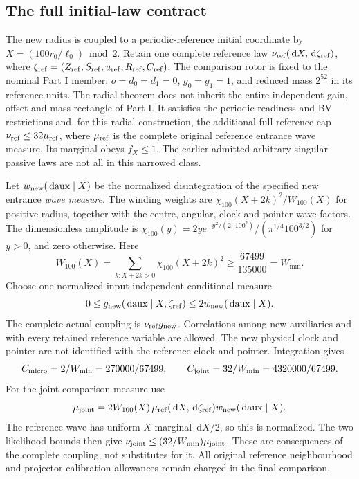 \documentclass[11pt]{article}
\theoremstyle{definition}\newtheorem{definition}[theorem]{Definition}
\theoremstyle{remark}\newtheorem{remark}[theorem]{Remark}
\newcommand{\dd}{\,\mathrm d}\newcommand{\Imv}{\operatorname{Im}}\newcommand{\ii}{\mathrm i}
\begin{document}
\subsection{The full initial-law contract}\label{sec:radial_law}
The new radius is coupled to a periodic-reference initial coordinate
by $X=(100r_0/\ell_0)\bmod2$. Retain one complete reference law
$\nu_{\rm ref}(\dd X,\dd\zeta_{\rm ref})$, where
$\zeta_{\rm ref}=(Z_{\rm ref},S_{\rm ref},u_{\rm ref},R_{\rm ref},C_{\rm ref})$.
The comparison rotor is fixed to the nominal Part I member:
$o=d_0=d_1=0$, $g_0=g_1=1$, and reduced mass $2^{52}$ in its
reference units. The radial theorem does not inherit the entire
independent gain, offset and mass rectangle of Part I.
It satisfies the periodic readiness and BV restrictions and, for this
radial construction, the additional full reference cap $\nu_{\rm ref}\le32\mu_{\rm ref}$,
where $\mu_{\rm ref}$ is the complete original reference entrance
wave measure. Its
marginal obeys $f_X\le1$. The earlier admitted arbitrary singular
passive laws are not all in this narrowed class.

Let $w_{\rm new}(\dd\mathrm{aux}\mid X)$ be the normalized
disintegration of the specified new entrance \emph{wave measure}.
The winding weights are $\chi_{100}(X+2k)^2/W_{100}(X)$ for positive
radius, together with the centre, angular, clock and pointer wave
factors. The dimensionless amplitude is
$\chi_{100}(y)=2y e^{-y^2/(2\cdot100^2)}/(\pi^{1/4}100^{3/2})$
for $y>0$, and zero otherwise. Here
\[
 W_{100}(X)=\sum_{k:X+2k>0}\chi_{100}(X+2k)^2
       \ge\frac{67499}{135000}=W_{\min}.
\]
Choose one normalized input-independent conditional measure
\[
 0\le g_{\rm new}(\dd\mathrm{aux}\mid X,\zeta_{\rm ref})
             \le2w_{\rm new}(\dd\mathrm{aux}\mid X).
\]
The complete actual coupling is $\nu_{\rm ref}g_{\rm new}$. Correlations
among new auxiliaries and with every retained reference variable are
allowed. The new physical clock and pointer are not identified with
the reference clock and pointer. Integration gives
\[
 C_{\rm micro}=2/W_{\min}=270000/67499,\qquad
 C_{\rm joint}=32/W_{\min}=4320000/67499.
\]
For the joint comparison measure use
\[
 \mu_{\rm joint}=2W_{100}(X)\,
       \mu_{\rm ref}(\dd X,\dd\zeta_{\rm ref})
       w_{\rm new}(\dd\mathrm{aux}\mid X).
\]
The reference wave has uniform $X$ marginal $\dd X/2$, so this is
normalized. The two likelihood bounds then give
$\nu_{\rm joint}\le(32/W_{\min})\mu_{\rm joint}$.
These are consequences of the complete coupling, not substitutes for it.
All original reference neighbourhood and projector-calibration allowances
remain charged in the final comparison.
\end{document}

